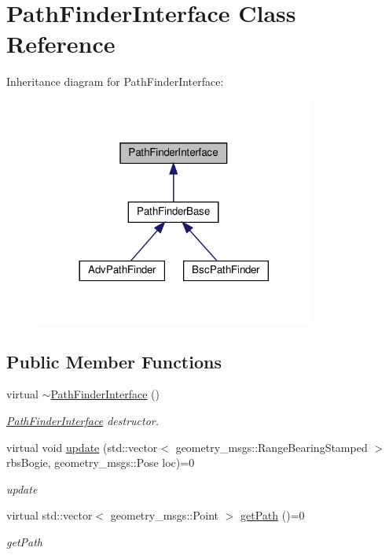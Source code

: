 \hypertarget{classPathFinderInterface}{}\section{Path\+Finder\+Interface Class Reference}
\label{classPathFinderInterface}


Inheritance diagram for Path\+Finder\+Interface\+:\nopagebreak
\begin{figure}[H]
\begin{center}
\leavevmode
\includegraphics[width=260pt]{classPathFinderInterface__inherit__graph}
\end{center}
\end{figure}
\subsection*{Public Member Functions}
\begin{DoxyCompactItemize}
\item 
virtual \hyperlink{classPathFinderInterface_a9c6812f65fba254224a475a4128441a8}{$\sim$\+Path\+Finder\+Interface} ()
\begin{DoxyCompactList}\small\item\em \hyperlink{classPathFinderInterface}{Path\+Finder\+Interface} destructor. \end{DoxyCompactList}\item 
virtual void \hyperlink{classPathFinderInterface_a8a2011052fb64cab85a66a21092416f2}{update} (std\+::vector$<$ geometry\+\_\+msgs\+::\+Range\+Bearing\+Stamped $>$ rbs\+Bogie, geometry\+\_\+msgs\+::\+Pose loc)=0
\begin{DoxyCompactList}\small\item\em update \end{DoxyCompactList}\item 
virtual std\+::vector$<$ geometry\+\_\+msgs\+::\+Point $>$ \hyperlink{classPathFinderInterface_adb55c9eab1ef3c4c1374c9d4313631de}{get\+Path} ()=0
\begin{DoxyCompactList}\small\item\em get\+Path \end{DoxyCompactList}\end{DoxyCompactItemize}


